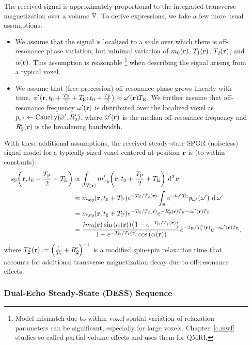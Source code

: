 The received signal
is approximately proportional 
to the integrated transverse magnetization
over a volume $\mathbb{V}$.
To derive expressions,
we take a few more usual assumptions:
\begin{itemize}
	\item We assume that
	the signal is localized
	to a scale over which
	there is off-resonance phase variation,
	but minimal variation
	of $\mzero\pr$, $\To\pr$, $\Tt\pr$, and $\flip\pr$.
	This assumption is reasonable
	\footnote{Model mismatch due
		to within-voxel spatial variation 
		of relaxation parameters
		can be significant,
		especially for large voxels.
		Chapter~\ref{c,mwf} studies 
		so-called partial volume effects
		and uses them for QMRI.
	} 
	when describing the signal 
	arising from a typical voxel.
	\item We assume that
	(free-precession) off-resonance phase 
	grows linearly with time,
	\ie $\php\paren{\bmr,t_0+\frac{\TP}{2}+\TE;t_0+\frac{\TP}{2}} \approx \omp\pr \TE$.
	We further assume
	that off-resonance frequency $\omp\pr$
	is distributed over the localized voxel
	as $\dist{\omp} \gets \operatorname{Cauchy}\paren{\ompmed,\Rtp}$,
	where $\ompmed\pr$ is the median off-resonance frequency
	and $\Rtp\pr$ is the broadening bandwidth.
\end{itemize}
With these additional assumptions,
the received steady-state SPGR (noiseless) signal model
for a typically sized voxel
centered at position $\mathbf{r}$ is (to within constants):
\begin{align}
	\spgr\paren{\bmr,t_0+\frac{\TP}{2}+\TE} 
	&\propto \int_{\setV\pr} \mxyp\paren{\bmr,t_0+\frac{\TP}{2}+\TE} \dercubed{\bmr} 
		\label{eq:spgr-int} \\
	&\approx \mxy\paren{\bmr,t_0+\TP} e^{-\TE/\Tt\pr} \int_\real e^{-i\omp \TE} 
		\dist{\omp}\paren{\omp} \der{\omp} \nonumber \\
	&= \mxy\paren{\bmr,t_0+\TP} e^{-\TE/\Tt\pr} e^{-\Rtp\pr\TE - i\ompmed\pr\TE} \nonumber \\
	&= \frac{i\mzero\pr \sina{\flip\pr} \paren{1-e^{-\TR/\To\pr}}}
	{1-e^{-\TR/\To\pr}\cosa{\alpha\pr}} e^{-\TE/\Tts\pr} e^{-i\ompmed\pr \TE},
		\label{eq:spgr-model}
\end{align}
where $\Tts\pr := \inv{\frac{1}{\Tt} + \Rtp}$
is a modified spin-spin relaxation time
that accounts for additional transverse magnetization decay
due to off-resonance effects.

\subsubsection{Dual-Echo Steady-State (DESS) Sequence}
\label{sss,bkgrd,mri,ss,dess}

